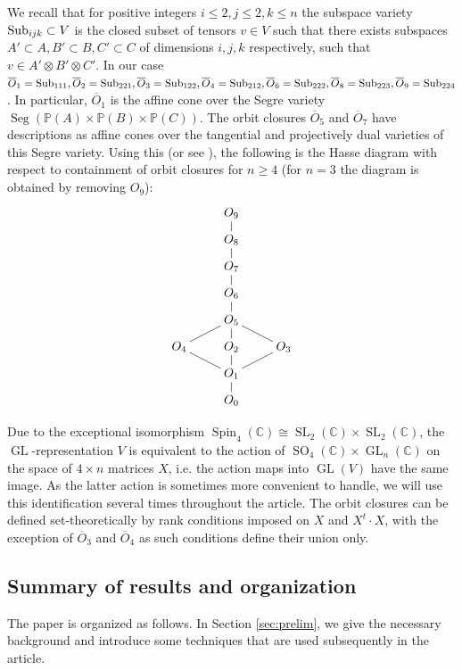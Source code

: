 \documentclass[11pt,reqno]{amsart}
\newcommand{\oo}{\otimes}
\newcommand{\tn}{\textnormal}
\newcommand{\C}{\mathbb{C}}
\newcommand{\GL}{\operatorname{GL}}
\newcommand{\SL}{\operatorname{SL}}
\newcommand{\bb}[1]{\mathbb{#1}}
\newcommand{\ol}[1]{\overline{#1}}
\newcommand{\op}[1]{\operatorname{#1}}
\numberwithin{equation}{section}
\begin{document}
We recall that for positive integers $i\leq 2,j \leq 2,k \leq n$ the subspace variety $\tn{Sub}_{ijk} \subset V$ is the closed subset of tensors $v \in V$ such that there exists subspaces $A' \subset A, B'\subset B, C'\subset C$ of dimensions $i,j,k$ respectively, such that $v \in A' \oo B' \oo C'$. 
In our case $\ol{O}_1 = \tn{Sub}_{111}, \ol{O}_2 = \tn{Sub}_{221},\ol{O}_3 = \tn{Sub}_{122},\ol{O}_4 = \tn{Sub}_{212}, \ol{O}_6 = \tn{Sub}_{222}, \ol{O}_8=\tn{Sub}_{223}, \ol{O}_9 = \tn{Sub}_{224}$. In particular, $\ol{O}_1$ is the affine cone over the Segre variety $\operatorname{Seg}(\bb{P}(A)\times \bb{P}(B)\times \mathbb{P}(C))$. The orbit closures $\ol{O}_5$ and $\ol{O}_7$ have descriptions as affine cones over the tangential and projectively dual varieties of this Segre variety. Using this (or see \cite{parfenov}), the following is the Hasse diagram with respect to containment of orbit closures for $n\geq 4$ (for $n=3$ the diagram is obtained by removing $O_9$):
\[\xymatrix@R-1.4pc{
 & O_9 \ar@{-}[d] & \\
 & O_8 \ar@{-}[d]& \\
 & O_7 \ar@{-}[d]& \\
 & O_6 \ar@{-}[d]& \\
 & O_5 \ar@{-}[dl]\ar@{-}[d]\ar@{-}[dr]& \\
O_4 \ar@{-}[dr] & O_2 \ar@{-}[d] & O_3 \ar@{-}[dl] \\
 & O_1 \ar@{-}[d]& \\
 & O_0 & \\
}\]

Due to the exceptional isomorphism $\op{Spin}_4(\C) \cong \SL_2(\C) \times \SL_2(\C)$, the $\GL$-representation $V$ is equivalent to the action of $\op{SO}_4(\C)\times  \GL_n(\C)$ on the space of $4\times n$ matrices $X$, i.e. the action maps into $\GL(V)$ have the same image. As the latter action is sometimes more convenient to handle, we will use this identification several times throughout the article. The orbit closures can be defined set-theoretically by rank conditions imposed on $X$ and $X^t\cdot X$, with the exception of $\ol{O}_3$ and $\ol{O}_4$ as such conditions define their union only.

\smallskip

\subsection*{Summary of results and organization} The paper is organized as follows. In Section \ref{sec:prelim}, we give the necessary background and introduce some techniques that are used subsequently in the article.
\end{document}
